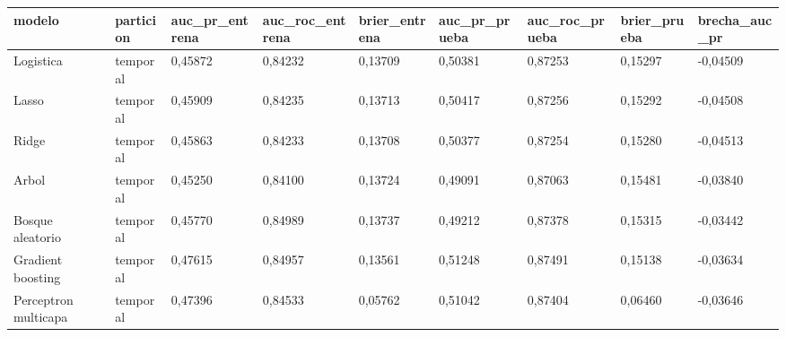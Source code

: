 \begin{tabular}{lllllllll}
\toprule
modelo & particion & auc\_pr\_entrena & auc\_roc\_entrena & brier\_entrena & auc\_pr\_prueba & auc\_roc\_prueba & brier\_prueba & brecha\_auc\_pr \\
\midrule
Logistica & temporal & 0{,}45872 & 0{,}84232 & 0{,}13709 & 0{,}50381 & 0{,}87253 & 0{,}15297 & -0{,}04509 \\
Lasso & temporal & 0{,}45909 & 0{,}84235 & 0{,}13713 & 0{,}50417 & 0{,}87256 & 0{,}15292 & -0{,}04508 \\
Ridge & temporal & 0{,}45863 & 0{,}84233 & 0{,}13708 & 0{,}50377 & 0{,}87254 & 0{,}15280 & -0{,}04513 \\
Arbol & temporal & 0{,}45250 & 0{,}84100 & 0{,}13724 & 0{,}49091 & 0{,}87063 & 0{,}15481 & -0{,}03840 \\
Bosque aleatorio & temporal & 0{,}45770 & 0{,}84989 & 0{,}13737 & 0{,}49212 & 0{,}87378 & 0{,}15315 & -0{,}03442 \\
Gradient boosting & temporal & 0{,}47615 & 0{,}84957 & 0{,}13561 & 0{,}51248 & 0{,}87491 & 0{,}15138 & -0{,}03634 \\
Perceptron multicapa & temporal & 0{,}47396 & 0{,}84533 & 0{,}05762 & 0{,}51042 & 0{,}87404 & 0{,}06460 & -0{,}03646 \\
\bottomrule
\end{tabular}
